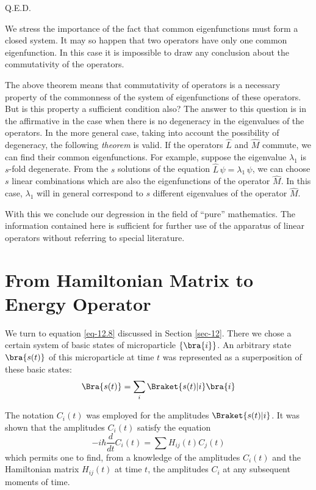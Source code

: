 \documentclass[a4paper,sfsidenotes,colorlinks=true]{tufte-book}
\numberwithin{equation}{section}
\numberwithin{figure}{section}
\begin{document}
Q.E.D. 

We stress the importance of the fact that common eigenfunctions must
form a closed system. It may so happen that two operators have only
one common eigenfunction. In this case it is impossible to draw any
conclusion about the commutativity of the operators.

The above theorem means that commutativity of operators is a necessary
property of the commonness of the system of eigenfunctions of these
operators. But is this property a sufficient condition also?  The
answer to this question is in the affirmative in the case when there
is no degeneracy in the eigenvalues of the operators. In the more
general case, taking into account the possibility of degeneracy, the
following \emph{theorem} is valid. If the operators $\hat{L}$ and
$\hat{M}$ commute, we can find their common eigenfunctions. For
example, suppose the eigenvalue $\lambda_{1}$ is $s$-fold
degenerate. From the $s$ solutions of the equation $\hat{L} \, \psi =
\lambda_{1} \, \psi$, we can choose $s$ linear combinations which are
also the eigenfunctions of the operator $\hat{M}$. In this case,
$\lambda_{1}$ will in general correspond to $s$ different eigenvalues
of the operator $\hat{M}$.

With this we conclude our degression in the field of ``pure''
mathematics. The information contained here is sufficient for further
use of the apparatus of linear operators without referring to special
literature.  
\section{From Hamiltonian Matrix to Energy Operator}
\label{sec-18}

We turn to
equation \ref{eq-12.8} discussed in Section \ref{sec-12}. There we
chose a certain system of basic states of microparticle $ \left\{
    \bra{i} \right\}$. An arbitrary state $\bra{s(t)}$ of this
microparticle at time $t$ was represented as a superposition of these
basic states:
\begin{equation}%
\Bra{s(t)} = \sum_{i} \Braket{s(t)| i} \bra{i}
\label{eq-18.1}
\end{equation}

The notation $C_{i} (t)$ was employed for the amplitudes $\Braket{s
  (t)| i}$. It was shown that the amplitudes $C_{i} (t)$ satisfy the
equation
\begin{equation}%
- i \hbar \frac{d}{dt} C_{i}(t) = \sum H_{ij} (t) C_{j}(t)
\label{eq-18.2}
\end{equation}
which permits one to find, from a knowledge of the amplitudes $C_{i} (t)$ and the Hamiltonian matrix $H_{ij} (t)$ at time $t$, the amplitudes $C_{i}$ at any subsequent moments of time.
\end{document}
